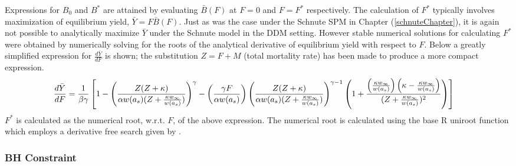 %
Expressions for $B_0$ and $B^*$ are attained by evaluating $\bar{B}(F)$ at
$F=0$ and $F=F^*$ respectively. The calculation of $F^*$ typically involves %
maximization of equilibrium yield, \mbox{$\bar{Y} = F\bar{B}(F)$.} Just as was 
the case under the Schnute SPM in Chapter (\ref{schnuteChapter}), it is again not
possible to analytically maximize $\bar{Y}$ under the Schnute model in the DDM setting. 
However stable numerical solutions for calculating $F^*$ were obtained by 
numerically solving for the roots of the analytical derivative of equilibrium 
yield with respect to $F$. Below a greatly simplified expression for $\frac{d \bar{Y}}{dF}$ 
is shown; the substitution $Z=F+M$ (total mortality rate) has been made to 
produce a more compact expression.
\begingroup
\scriptsize
\begin{align}
\frac{d \bar{Y}}{dF} &= \frac{1}{\beta\gamma}\left[ 1 - \left(\frac{Z(Z+\kappa)}{\alpha w(a_s)(Z+\frac{\kappa w_\infty}{w(a_s)})}\right)^\gamma - \left(\frac{\gamma F}{\alpha w(a_s)}\right) \left(\frac{Z(Z+\kappa)}{\alpha w(a_s)(Z+\frac{\kappa w_\infty}{w(a_s)})}\right)^{\gamma-1} \left( 1 + \frac{\left(\frac{\kappa w_\infty}{w(a_s)}\right)\left(\kappa-\frac{\kappa w_\infty}{w(a_s)}\right)}{(Z+\frac{\kappa w_\infty}{w(a_s)})^2} \right) \right]\label{dBdFS}
\end{align}
\endgroup
%
$F^*$ is calculated as the numerical root, w.r.t. $F$, of the above expression.
The numerical root is calculated using the base R uniroot function which
employs a derivative free search given by \cite{brent_chapter_1973}. %

%
\subsubsection{BH Constraint}

